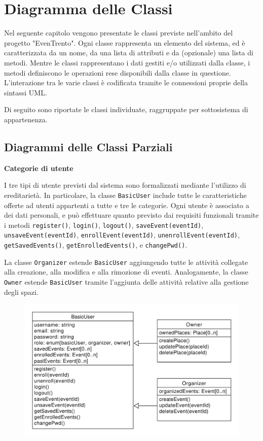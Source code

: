 \documentclass[9pt]{extarticle}
\begin{document}
\newpage

\section{Diagramma delle Classi}

Nel seguente capitolo vengono presentate le classi previste nell'ambito del progetto "EvenTrento". Ogni classe rappresenta un elemento del sistema, ed è caratterizzata da un nome, da una lista di attributi e da (opzionale) una lista di metodi.
Mentre le classi rappresentano i dati gestiti e/o utilizzati dalla classe, i metodi definiscono le operazioni rese disponibili dalla classe in questione. L'interazione tra le varie classi è codificata tramite le connessioni proprie della sintassi UML.

Di seguito sono riportate le classi individuate, raggruppate per sottosistema di appartenenza.

\subsection{Diagrammi delle Classi Parziali}

\textbf{Categorie di utente}


I tre tipi di utente previsti dal sistema sono formalizzati mediante l'utilizzo di ereditarietà. In particolare, la classe \verb*|BasicUser| include tutte le caratteristiche offerte ad utenti appartenti a tutte e tre le categorie. Ogni utente è associato a dei dati personali, e può effettuare quanto previsto dai requisiti funzionali tramite i metodi \verb*|register()|, \verb*|login()|, \verb*|logout()|, \verb*|saveEvent(eventId)|, \verb*|unsaveEvent(eventId)|, \verb*|enrollEvent(eventId)|, \verb*|unenrollEvent(eventId)|, \verb*|getSavedEvents()|, \verb*|getEnrolledEvents()|, e \verb*|changePwd()|.


La classe \verb*|Organizer| estende \verb*|BasicUser| aggiungendo tutte le attività collegate alla creazione, alla modifica e alla rimozione di eventi. Analogamente, la classe \verb*|Owner| estende \verb*|BasicUser| tramite l'aggiunta delle attività relative alla gestione degli spazi.

\begin{figure}[!htb]
	\centering
	\includegraphics[width=.8\linewidth]{./images/classDiagramUsers.pdf}
		\caption{}
	\label{fig:classDiagramUsers}
\end{figure}
\end{document}
